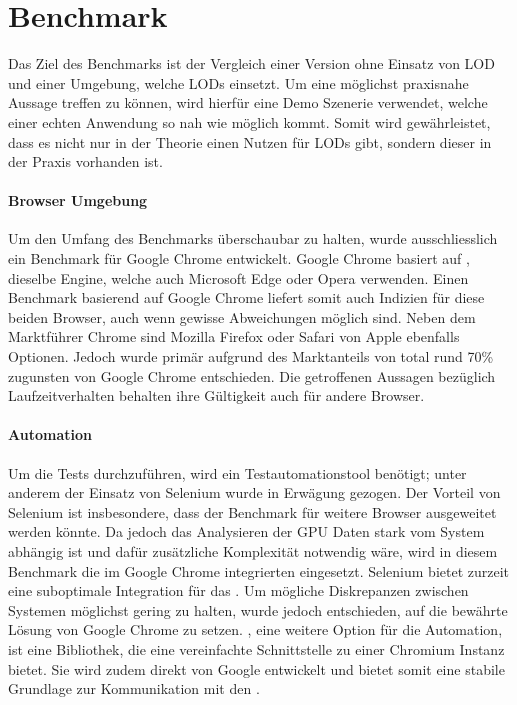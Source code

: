 \section{Benchmark}

Das Ziel des Benchmarks ist der Vergleich einer Version ohne Einsatz von LOD und einer Umgebung, welche LODs einsetzt. Um eine möglichst praxisnahe Aussage treffen zu können, wird hierfür eine Demo Szenerie verwendet, welche einer echten Anwendung so nah wie möglich kommt. Somit wird gewährleistet, dass es nicht nur in der Theorie einen Nutzen für LODs gibt, sondern dieser in der Praxis vorhanden ist.

\paragraph{Browser Umgebung}
Um den Umfang des Benchmarks überschaubar zu halten, wurde ausschliesslich ein Benchmark für Google Chrome entwickelt.
Google Chrome basiert auf , dieselbe Engine, welche auch Microsoft Edge oder Opera verwenden.
Einen Benchmark basierend auf Google Chrome liefert somit auch Indizien für diese beiden Browser, auch wenn gewisse Abweichungen möglich sind.
Neben dem Marktführer Chrome sind Mozilla Firefox oder Safari von Apple ebenfalls Optionen. Jedoch wurde primär aufgrund des Marktanteils von total rund 70\% \cite{browserUsage} zugunsten von Google Chrome entschieden.
Die getroffenen Aussagen bezüglich Laufzeitverhalten behalten ihre Gültigkeit auch für andere Browser.

\paragraph{Automation}
Um die Tests durchzuführen, wird ein Testautomationstool benötigt; unter anderem der Einsatz von Selenium wurde in Erwägung gezogen.
Der Vorteil von Selenium ist insbesondere, dass der Benchmark für weitere Browser ausgeweitet werden könnte.
Da jedoch das Analysieren der GPU Daten stark vom System abhängig ist und dafür zusätzliche Komplexität notwendig wäre, wird in diesem Benchmark die im Google Chrome integrierten  eingesetzt.
Selenium bietet zurzeit eine suboptimale Integration für das .
Um mögliche Diskrepanzen zwischen Systemen möglichst gering zu halten, wurde jedoch entschieden, auf die bewährte Lösung von Google Chrome zu setzen.
, eine weitere Option für die Automation, ist eine Bibliothek, die eine vereinfachte Schnittstelle zu einer Chromium Instanz bietet.
Sie wird zudem direkt von Google entwickelt und bietet somit eine stabile Grundlage zur Kommunikation mit den .

